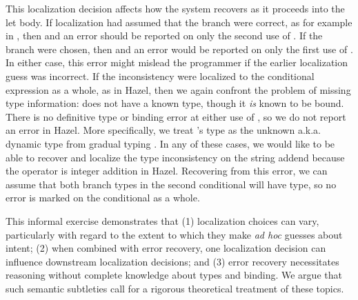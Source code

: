 This localization decision affects how the system recovers as it proceeds into the let body. 
If localization had assumed that the  branch were correct, as for example in , then 
 and an error should be reported on only the second use of . 
If the  branch were chosen, then  and an error would be reported on only the first use of . 
 In either case, this error might mislead the programmer if the earlier localization guess was incorrect.
If the inconsistency were localized to the conditional expression as a whole, as in Hazel, then we again confront the problem of missing type information: 
 does not have a known type,
though it \emph{is} known to be bound. 
There is no definitive type or binding error at either use of , 
so we do not report an error in Hazel. More specifically, we treat 's type as the unknown a.k.a. dynamic type from gradual typing \cite{Siek06a}.
In any of these cases, we would like to be able to recover and 
localize the type inconsistency on the string addend because the \li{+} operator is integer addition in Hazel.
Recovering from this error, we can assume that both branch types in the second conditional will have  type, so no 
error is marked on the conditional as a whole.

This informal exercise demonstrates that (1) localization choices can vary, particularly with regard to the extent to which they make \emph{ad hoc} guesses about intent;  
(2) when combined with error recovery, one localization decision can influence downstream localization decisions; and 
(3) error recovery necessitates reasoning without complete knowledge about types and binding. We argue that such semantic subtleties call for a rigorous theoretical treatment of these topics.

